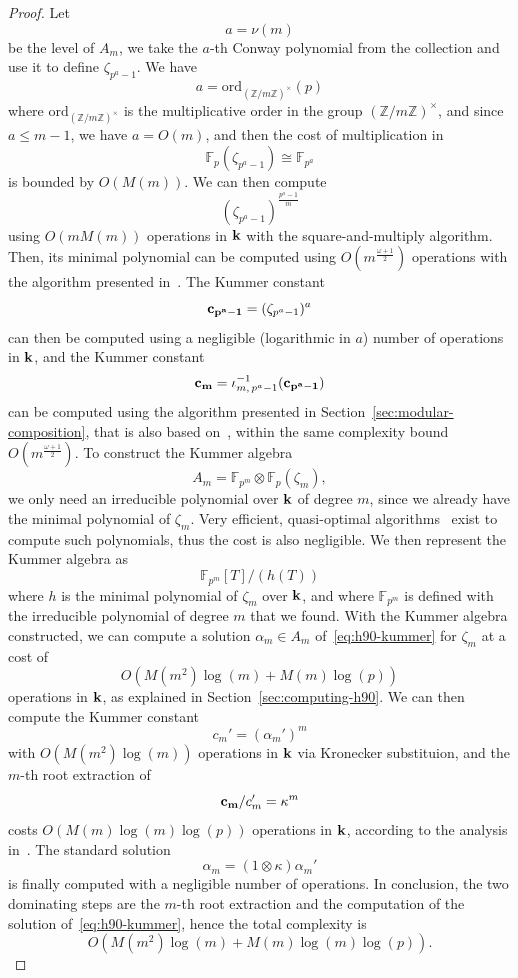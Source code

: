\begin{proof}
Let 
\[
  a = \nu(m)
\]
be the level of $A_m$, we take the $a$-th Conway polynomial from the collection
and use it to define $\zeta_{p^a-1}$. We have
\[
  a = \mathrm{ord}_{(\mathbb{Z}/m\mathbb{Z})^\times}(p)
\]
where $\mathrm{ord}_{(\mathbb{Z}/m\mathbb{Z})^\times}$ is the multiplicative
order in the group $(\mathbb{Z}/m\mathbb{Z})^\times$, and since $a\leq m-1$, we
have $a=O(m)$, and then the cost of multiplication in
\[
  \mathbb{F}_p(\zeta_{p^a-1}) \cong \mathbb{F}_{p^{a}}
\]
is bounded by $O(M(m))$. We can then compute 
\[
  (\zeta_{p^a-1})^{\frac{p^a-1}{m}}
\]
using $O(mM(m))$ operations in $\mathbf{k}$ with the square-and-multiply algorithm.
Then, its minimal polynomial can be computed using $O(m^{\frac{\omega+1}{2}})$
operations with the algorithm presented in~\cite{Shoup94}. The Kummer constant
\[
  \mathbf{c_{p^a-1}} = (\zeta_{p^a-1})^a
\]
can then be computed using a negligible (logarithmic in $a$) number of
operations in $\mathbf{k}$, and the Kummer constant
\[
  \mathbf{c_{m}} = \iota_{m,\, p^a-1}^{-1}(\mathbf{c_{p^a-1}})
\]
can be computed using the algorithm presented in
Section~\ref{sec:modular-composition}, that is also based on~\cite{Shoup94},
within the same complexity bound $O(m^{\frac{\omega+1}{2}})$.
To construct the Kummer algebra
\[
  A_m = \mathbb{F}_{p^{m}}\otimes\mathbb{F}_p(\zeta_m),
\]
we only need an irreducible polynomial over $\mathbf{k}$ of degree $m$, since we
already have the minimal polynomial of $\zeta_m$. Very efficient, quasi-optimal
algorithms~\cite{BFSS06, CL13, DDS13} exist to compute such polynomials, thus
the cost is also negligible. We then represent the Kummer algebra as
\[
  \mathbb{F}_{p^{m}}[T]/(h(T))
\]
where $h$ is the minimal polynomial of $\zeta_m$ over $\mathbf{k}$, and where
$\mathbb{F}_{p^{m}}$ is defined with the irreducible polynomial of degree $m$
that we found.
With the Kummer algebra constructed, we can
compute a solution $\alpha_m\in A_m$ of~\eqref{eq:h90-kummer} for $\zeta_m$ at
a cost of 
\[
  O(M(m^2)\log(m)+M(m)\log(p))
\]
operations in
$\mathbf{k}$, as explained in Section~\ref{sec:computing-h90}. We can then compute the
Kummer constant
\[
  c_m' = (\alpha_m')^m
\]
with $O(M(m^2)\log(m))$ operations in $\mathbf{k}$ via Kronecker substituion, and the
$m$-th root extraction of
\[
  \mathbf{c_{m}}/c_m' = \kappa^m
\]
costs $O(M(m)\log(m)\log(p))$ operations in $\mathbf{k}$, according to the analysis
in~\cite{BDDFS17}. The standard solution
\[
  \alpha_m = (1\otimes\kappa)\alpha_m'
\]
is finally computed with a negligible number of operations. In conclusion, the
two dominating steps are the $m$-th root extraction and the computation of the
solution of~\eqref{eq:h90-kummer}, hence the total complexity is
\[
  O(M(m^2)\log(m)+M(m)\log(m)\log(p)).
\]
\end{proof}
